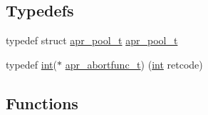 \subsection*{Typedefs}
\begin{DoxyCompactItemize}
\item 
typedef struct \hyperlink{structapr__pool__t}{apr\+\_\+pool\+\_\+t} \hyperlink{group__apr__pools_gaf137f28edcf9a086cd6bc36c20d7cdfb}{apr\+\_\+pool\+\_\+t}
\item 
typedef \hyperlink{pcre_8txt_a42dfa4ff673c82d8efe7144098fbc198}{int}($\ast$ \hyperlink{group__apr__pools_ga370a939349adf6d1438068e2fc69a0dd}{apr\+\_\+abortfunc\+\_\+t}) (\hyperlink{pcre_8txt_a42dfa4ff673c82d8efe7144098fbc198}{int} retcode)
\end{DoxyCompactItemize}
\subsection*{Functions}
